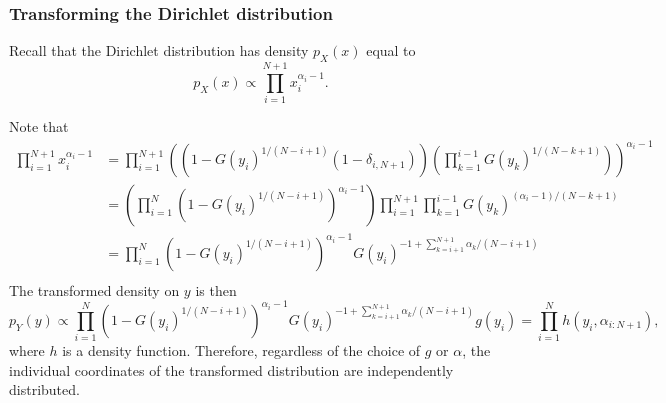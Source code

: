 \begin{appendices}
\subsubsection{Transforming the Dirichlet distribution}

Recall that the Dirichlet distribution has density $p_X(x)$ equal to
\[
p_X(x) \propto \prod_{i=1}^{N+1} x_i^{\alpha_i - 1}.
\]

Note that
\[
\begin{aligned}
\prod_{i=1}^{N+1} x_i^{\alpha_i - 1} &= \prod_{i=1}^{N+1} \left(\left(1-G(y_i)^{1/(N-i+1)}(1 - \delta_{i,N+1})\right)\left(\prod_{k=1}^{i-1} G(y_k)^{1/(N-k+1)}\right)\right)^{\alpha_i - 1}\\
&= \left(\prod_{i=1}^{N} \left(1-G(y_i)^{1/(N-i+1)}\right)^{\alpha_i - 1}\right) \prod_{i=1}^{N+1}\prod_{k=1}^{i-1} G(y_k)^{(\alpha_i - 1)/(N-k+1)}\\
&= \prod_{i=1}^{N} \left(1-G(y_i)^{1/(N-i+1)}\right)^{\alpha_i - 1} G(y_i)^{-1+\sum_{k=i+1}^{N+1}\alpha_k/(N-i+1)}\\
\end{aligned}
\]
The transformed density on $y$ is then
\[
p_Y(y) \propto \prod_{i=1}^{N} \left(1-G(y_i)^{1/(N-i+1)}\right)^{\alpha_i - 1} G(y_i)^{-1+\sum_{k=i+1}^{N+1}\alpha_k/(N-i+1)} g(y_i) = \prod_{i=1}^{N} h(y_i, \alpha_{i:N+1}),
\]
where $h$ is a density function.
Therefore, regardless of the choice of $g$ or $\alpha$, the individual coordinates of the transformed distribution are independently distributed.


\end{appendices}